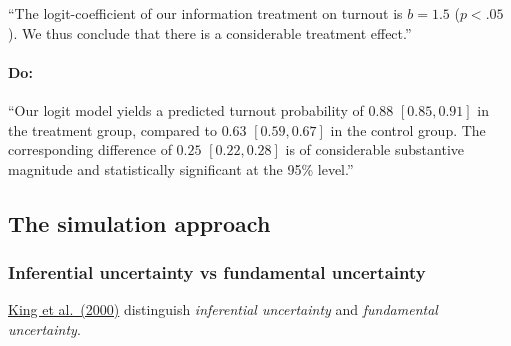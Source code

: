 \documentclass[
  11pt,
]{article}
\begin{document}
``The logit-coefficient of our information treatment on turnout is \(b = 1.5\) (\(p < .05\)). We thus conclude that there is a considerable treatment effect.''

\hypertarget{do}{%
\paragraph{Do:}\label{do}}

``Our logit model yields a predicted turnout probability of \(0.88\) \([0.85, 0.91]\) in the treatment group, compared to \(0.63\) \([0.59, 0.67]\) in the control group. The corresponding difference of \(0.25\) \([0.22, 0.28]\) is of considerable substantive magnitude and statistically significant at the 95\% level.''

\hypertarget{the-simulation-approach}{%
\subsection{The simulation approach}\label{the-simulation-approach}}

\hypertarget{inferential-uncertainty-vs-fundamental-uncertainty}{%
\subsubsection{Inferential uncertainty vs fundamental uncertainty}\label{inferential-uncertainty-vs-fundamental-uncertainty}}

\href{https://gking.harvard.edu/files/gking/files/making.pdf}{King et al.~(2000)} distinguish \emph{inferential uncertainty} and \emph{fundamental uncertainty}.
\end{document}
